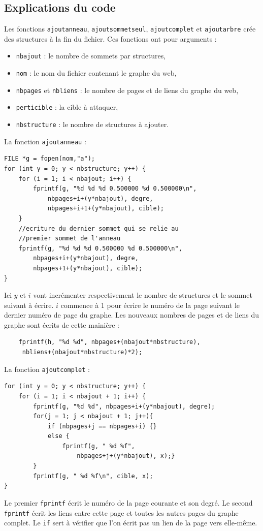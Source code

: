 \documentclass[a4paper,11pt]{article}
\begin{document}
	\subsection{Explications du code}
		Les fonctions \texttt{ajoutanneau}, \texttt{ajoutsommetseul}, \texttt{ajoutcomplet} et \texttt{ajoutarbre} crée des structures à la fin du fichier. Ces fonctions ont pour arguments :
		\begin{itemize}
			\item \texttt{nbajout} : le nombre de sommets par structures,
			\item \texttt{nom} : le nom du fichier contenant le graphe du web,
			\item \texttt{nbpages} et \texttt{nbliens} : le nombre de pages et de liens du graphe du web,
			\item \texttt{perticible} : la cible à attaquer,
			\item \texttt{nbstructure} : le nombre de structures à ajouter.
		\end{itemize}
		La fonction \texttt{ajoutanneau} : 
		\begin{lstlisting}
FILE *g = fopen(nom,"a");
for (int y = 0; y < nbstructure; y++) {
	for (i = 1; i < nbajout; i++) {
		fprintf(g, "%d %d %d 0.500000 %d 0.500000\n", 
			nbpages+i+(y*nbajout), degre, 
			nbpages+i+1+(y*nbajout), cible);
	}
	//ecriture du dernier sommet qui se relie au 
	//premier sommet de l'anneau
	fprintf(g, "%d %d %d 0.500000 %d 0.500000\n", 
		nbpages+i+(y*nbajout), degre, 
		nbpages+1+(y*nbajout), cible);
}
	\end{lstlisting}
	Ici $y$ et $i$ vont incrémenter respectivement le nombre de structures et le sommet suivant à écrire. $i$ commence à 1 pour écrire le numéro de la page suivant le dernier numéro de page du graphe.
	Les nouveaux nombres de pages et de liens du graphe sont écrits de cette mainière :
	\begin{lstlisting}
	fprintf(h, "%d %d", nbpages+(nbajout*nbstructure),
	 nbliens+(nbajout*nbstructure)*2);
	\end{lstlisting}
	La fonction \texttt{ajoutcomplet} :
	\begin{lstlisting}
for (int y = 0; y < nbstructure; y++) {
	for (i = 1; i < nbajout + 1; i++) {
		fprintf(g, "%d %d", nbpages+i+(y*nbajout), degre);
		for(j = 1; j < nbajout + 1; j++){
			if (nbpages+j == nbpages+i) {}
			else {
				fprintf(g, " %d %f", 
					nbpages+j+(y*nbajout), x);}
		}
		fprintf(g, " %d %f\n", cible, x);
}	
	\end{lstlisting}
	Le premier \texttt{fprintf} écrit le numéro de la page courante et son degré. Le second \texttt{fprintf} écrit les liens entre cette page et toutes les autres pages du graphe complet. Le \texttt{if} sert à vérifier que l'on écrit pas un lien de la page vers elle-même.\\
\end{document}
